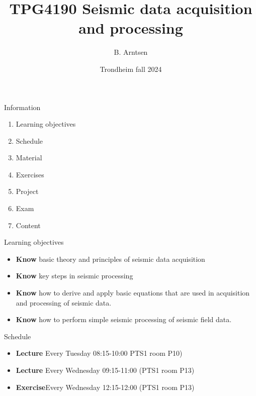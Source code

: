 \documentclass[xcolor=dvipsnames,notes]{beamer}
\begin{document}
\title{TPG4190 Seismic data acquisition and processing}
\author{B. Arntsen}
\date{Trondheim fall 2024}
\begin{frame}
 \titlepage
\end{frame}
\begin{frame}{Information}
\begin{enumerate}
  \item Learning objectives
  \item Schedule
  \item Material
  \item Exercises
  \item Project
  \item Exam
  \item Content
\end{enumerate}
\end{frame}
\begin{frame}{Learning objectives}
\begin{itemize}
\item {\bf Know} basic theory and principles of seismic
                 data acquisition
\item {\bf Know} key steps in seismic processing
\item {\bf Know} how to derive and
                 apply basic equations that are used in acquisition 
                 and processing of seismic
                 data.
\item {\bf Know} how to perform simple seismic processing of seismic
                  field data.
\end{itemize}
\end{frame}
\begin{frame}{Schedule}
\begin{itemize}
\item {\bf Lecture} Every Tuesday  08:15-10:00 PTS1 room P10)
\item {\bf Lecture} Every Wednesday   09:15-11:00 (PTS1 room P13) 
\item {\bf Exercise}Every Wednesday   12:15-12:00       (PTS1 room P13)
\end{itemize}
\end{frame}
\end{document}
